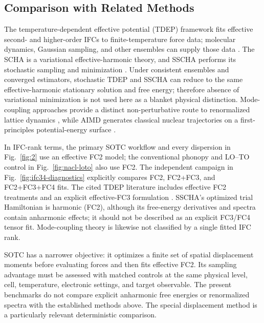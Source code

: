 \documentclass[aps,prb,reprint,amsmath,amssymb,floatfix]{revtex4-2}
\begin{document}
\subsection{Comparison with Related
Methods}\label{comparison-with-related-methods}

\color{revisionblue}
The temperature-dependent effective potential (TDEP) framework fits effective
second- and higher-order IFCs to finite-temperature force data; molecular
dynamics, Gaussian sampling, and other ensembles can supply those data
\cite{ref5,ref6,ref10,ref52}. The SCHA is a variational effective-harmonic
theory, and SSCHA performs its stochastic sampling and minimization
\cite{ref7,ref8,ref50}. Under consistent ensembles and converged estimators,
stochastic TDEP and SSCHA can reduce to the same effective-harmonic stationary
solution and free energy; therefore absence of variational minimization is not
used here as a blanket physical distinction. Mode-coupling approaches provide a
distinct non-perturbative route to renormalized lattice dynamics \cite{ref51},
while AIMD generates classical nuclear trajectories on a first-principles
potential-energy surface \cite{ref9}.
\color{black}

\color{revisionblue}
In IFC-rank terms, the primary SOTC workflow and every dispersion in
Fig.~\ref{fig:2} use an effective FC2 model; the conventional phonopy and
LO--TO control in Fig.~\ref{fig:nacl-loto} also use FC2. The independent
campaign in Fig.~\ref{fig:ifc34-diagnostics} explicitly compares FC2,
FC2+FC3, and FC2+FC3+FC4 fits. The cited TDEP literature includes effective
FC2 treatments \cite{ref5,ref6} and an explicit effective-FC3 formulation
\cite{ref52}. SSCHA's optimized trial Hamiltonian is harmonic (FC2), although
its free-energy derivatives and spectra contain anharmonic effects; it should
not be described as an explicit FC3/FC4 tensor fit. Mode-coupling theory is
likewise not classified by a single fitted IFC rank.
\color{black}

\color{revisionblue}
SOTC has a narrower objective: it optimizes a finite set of spatial displacement
moments before evaluating forces and then fits effective FC2. Its sampling
advantage must be assessed with matched controls at the same physical level,
cell, temperature, electronic settings, and target observable. The present
benchmarks do not compare explicit anharmonic free energies or renormalized
spectra with the established methods above. The special displacement method
\cite{ref42} is a particularly relevant deterministic comparison.
\color{black}
\end{document}
